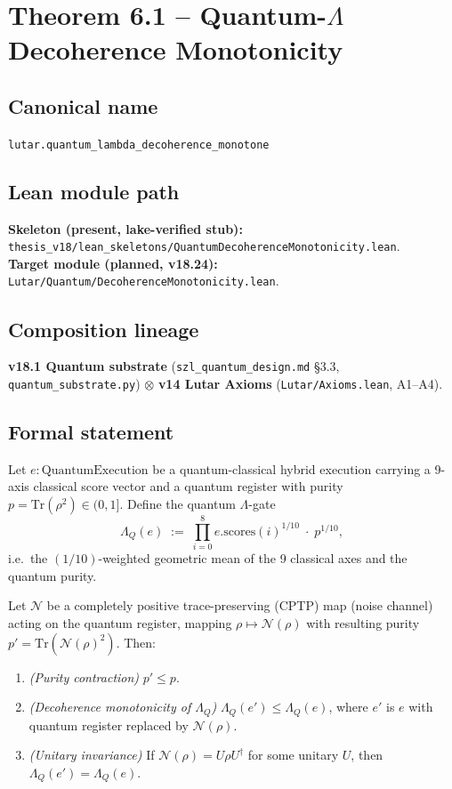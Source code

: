 \section{Theorem 6.1 -- Quantum-$\Lambda$ Decoherence Monotonicity}
\label{sec:thm01}

\subsection*{Canonical name}
\verb|lutar.quantum_lambda_decoherence_monotone|

\subsection*{Lean module path}
\textbf{Skeleton (present, lake-verified stub):}
\texttt{thesis\_v18/lean\_skeletons/QuantumDecoherenceMonotonicity.lean}.\\
\textbf{Target module (planned, v18.24):}
\texttt{Lutar/Quantum/DecoherenceMonotonicity.lean}.

\subsection*{Composition lineage}
\textbf{v18.1 Quantum substrate}
(\texttt{szl\_quantum\_design.md} \S{}3.3, \texttt{quantum\_substrate.py})
$\otimes$
\textbf{v14 Lutar Axioms}
(\texttt{Lutar/Axioms.lean}, A1--A4).

\subsection*{Formal statement}

\begin{theorem}
\label{thm:quantum-decoherence}
Let $e : \mathrm{QuantumExecution}$ be a quantum-classical hybrid
execution carrying a 9-axis classical score vector and a quantum
register with purity $p = \mathrm{Tr}(\rho^2) \in (0, 1]$.  Define
the quantum \(\Lambda\)-gate
\[
  \Lambda_Q(e)
  \;:=\;
  \prod_{i=0}^{8} e.\mathrm{scores}(i)^{1/10}
  \;\cdot\;
  p^{1/10},
\]
i.e.\ the $(1/10)$-weighted geometric mean of the 9 classical axes
and the quantum purity.

Let $\mathcal{N}$ be a completely positive trace-preserving (CPTP)
map (noise channel) acting on the quantum register, mapping
$\rho \mapsto \mathcal{N}(\rho)$ with resulting purity
$p' = \mathrm{Tr}(\mathcal{N}(\rho)^2)$.  Then:
\begin{enumerate}
  \item \emph{(Purity contraction)} $p' \leq p$.
  \item \emph{(Decoherence monotonicity of $\Lambda_Q$)}
        $\Lambda_Q(e') \leq \Lambda_Q(e)$,
        where $e'$ is $e$ with quantum register replaced by
        $\mathcal{N}(\rho)$.
  \item \emph{(Unitary invariance)} If $\mathcal{N}(\rho) = U\rho U^\dagger$
        for some unitary $U$, then $\Lambda_Q(e') = \Lambda_Q(e)$.
\end{enumerate}
\end{theorem}

